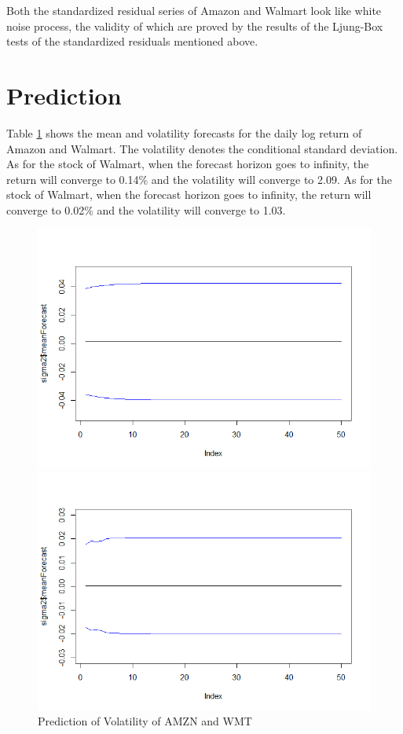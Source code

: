 \documentclass[paper=a4, fontsize=11pt]{article}
\begin{document}
Both the standardized residual series of Amazon and Walmart look like white noise process, the validity of which are proved by the results of the Ljung-Box tests of the standardized residuals mentioned above.

\section{Prediction}
Table \ref{predict} shows the mean and volatility forecasts for the daily log return of Amazon and Walmart. The volatility denotes the conditional standard deviation. As for the stock of Walmart, when the forecast horizon goes to infinity, the return will converge to 0.14\% and the volatility will converge to 2.09. As for the stock of Walmart, when the forecast horizon goes to infinity, the return will converge to 0.02\% and the volatility will converge to 1.03. 

\begin{figure}[!htbp]
\begin{minipage}[!htbp]{0.5\linewidth}
\centering
\includegraphics[scale = 0.45]{img/predict_AMZN}
\end{minipage}
\begin{minipage}[!htbp]{0.5\linewidth}
\centering
\includegraphics[scale = 0.45]{img/predict_WMT}
\end{minipage}
\caption{Prediction of Volatility of AMZN and WMT}
\label{predict}
\end{figure}
\end{document}
